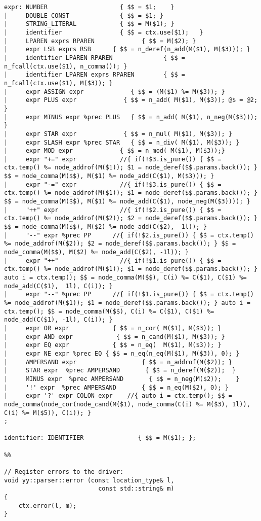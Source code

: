\documentclass[english,a4paper,12pt]{report}
\begin{document}
\begin{lstlisting}
expr: NUMBER                    { $$ = $1;    }
|     DOUBLE_CONST              { $$ = $1; }
|     STRING_LITERAL            { $$ = M($1); }
|     identifier                { $$ = ctx.use($1);   }
|     LPAREN exprs RPAREN             { $$ = M($2); }
|     expr LSB exprs RSB      { $$ = n_deref(n_add(M($1), M($3))); }
|     identifier LPAREN RPAREN              { $$ = n_fcall(ctx.use($1), n_comma()); }
|     identifier LPAREN exprs RPAREN        { $$ = n_fcall(ctx.use($1), M($3)); }
|     expr ASSIGN expr             { $$ = (M($1) %= M($3)); }
|     expr PLUS expr             { $$ = n_add( M($1), M($3)); @$ = @2; }
|     expr MINUS expr %prec PLUS   { $$ = n_add( M($1), n_neg(M($3))); }
|     expr STAR expr             { $$ = n_mul( M($1), M($3)); }
|     expr SLASH expr %prec STAR   { $$ = n_div( M($1), M($3)); }
|     expr MOD expr             { $$ = n_mod( M($1), M($3));}
|     expr "+=" expr            //{ if(!$3.is_pure()) { $$ = ctx.temp() %= node_addrof(M($1)); $1 = node_deref($$.params.back()); } $$ = node_comma(M($$), M($1) %= node_add(C($1), M($3))); }
|     expr "-=" expr            //{ if(!$3.is_pure()) { $$ = ctx.temp() %= node_addrof(M($1)); $1 = node_deref($$.params.back()); } $$ = node_comma(M($$), M($1) %= node_add(C($1), node_neg(M($3)))); }
|     "++" expr                 //{ if(!$2.is_pure()) { $$ = ctx.temp() %= node_addrof(M($2)); $2 = node_deref($$.params.back()); } $$ = node_comma(M($$), M($2) %= node_add(C($2),  1l)); }
|     "--" expr %prec PP      //{ if(!$2.is_pure()) { $$ = ctx.temp() %= node_addrof(M($2)); $2 = node_deref($$.params.back()); } $$ = node_comma(M($$), M($2) %= node_add(C($2), -1l)); }
|     expr "++"                 //{ if(!$1.is_pure()) { $$ = ctx.temp() %= node_addrof(M($1)); $1 = node_deref($$.params.back()); } auto i = ctx.temp(); $$ = node_comma(M($$), C(i) %= C($1), C($1) %= node_add(C($1),  1l), C(i)); }
|     expr "--" %prec PP      //{ if(!$1.is_pure()) { $$ = ctx.temp() %= node_addrof(M($1)); $1 = node_deref($$.params.back()); } auto i = ctx.temp(); $$ = node_comma(M($$), C(i) %= C($1), C($1) %= node_add(C($1), -1l), C(i)); }
|     expr OR expr            { $$ = n_cor( M($1), M($3)); }
|     expr AND expr            { $$ = n_cand(M($1), M($3)); }
|     expr EQ expr            { $$ = n_eq(  M($1), M($3)); }
|     expr NE expr %prec EQ { $$ = n_eq(n_eq(M($1), M($3)), 0); }
|     AMPERSAND expr                  { $$ = n_addrof(M($2)); }
|     STAR expr  %prec AMPERSAND       { $$ = n_deref(M($2));  }
|     MINUS expr  %prec AMPERSAND       { $$ = n_neg(M($2));    }
|     '!' expr  %prec AMPERSAND       { $$ = n_eq(M($2), 0); }
|     expr '?' expr COLON expr    //{ auto i = ctx.temp(); $$ = node_comma(node_cor(node_cand(M($1), node_comma(C(i) %= M($3), 1l)), C(i) %= M($5)), C(i)); }
;

identifier: IDENTIFIER               { $$ = M($1); };

%%

// Register errors to the driver:
void yy::parser::error (const location_type& l,
                          const std::string& m)
{
    ctx.error(l, m);
}
\end{lstlisting}
\end{document}

